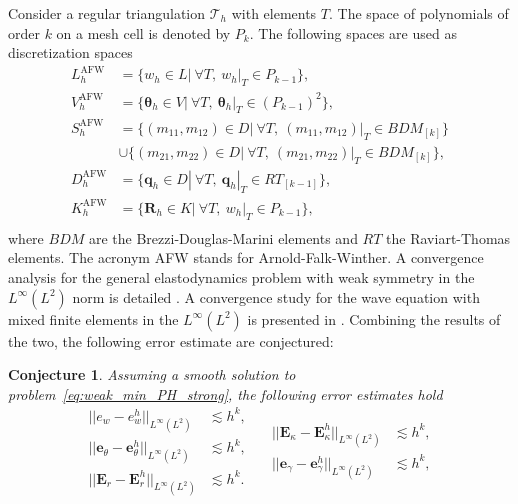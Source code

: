 \documentclass{ifacconf}
\newtheorem{conjecture}{Conjecture}
\begin{document}
Consider a regular triangulation $\mathcal{T}_h$ with elements $T$. The space of polynomials of order $k$ on a mesh cell is denoted by $P_k$. The following spaces are used as discretization spaces
\begin{equation}
\label{eq:AFW}
\begin{aligned}
L_h^{\text{AFW}} &= \{w_h \in L | \ \forall T, \ w_h|_{T} \in P_{k-1} \}, \\
V_h^{\text{AFW}} &= \{\bm{\theta}_h \in V | \ \forall T,\ \bm{\theta}_h|_{T} \in (P_{k-1})^2 \}, \\
S_h^{\text{AFW}} &= \{(m_{11}, m_{12}) \in D| \ \forall T,\ (m_{11}, m_{12})|_{T} \in BDM_{[k]} \}  \\
& \cup \{(m_{21}, m_{22}) \in D| \ \forall T,\ (m_{21}, m_{22})|_{T} \in BDM_{[k]} \}, \\
D_h^{\text{AFW}} &= \{\bm{q}_h \in D | \ \forall T,\ \bm{q}_h|_{T} \in RT_{[k-1]} \}, \\
K_h^{\text{AFW}} &= \{\bm{R}_h \in K | \ \forall T, \ w_h|_{T} \in P_{k-1} \}, \\ 
\end{aligned}
\end{equation}
where $BDM$ are the Brezzi-Douglas-Marini elements and $RT$ the Raviart-Thomas elements. The acronym AFW stands for Arnold-Falk-Winther. A convergence analysis for the general elastodynamics problem with weak symmetry in the $L^\infty (L^2)$ norm is detailed \cite{ArnoldWeak}. A convergence study for the wave equation with mixed finite elements in the $L^\infty (L^2)$ is presented in \cite{Geveci}. Combining the results of the two, the following error estimate are conjectured:
\begin{conjecture}
	Assuming a smooth solution to problem~\eqref{eq:weak_min_PH_strong}, the following error estimates hold 
	\begin{equation}
	\label{eq:errAFW}
	\begin{aligned}
	||e_w - e_w^h||_{L^{\infty}(L^2)} &\lesssim h^{k}, \\
	||\bm{e}_\theta - \bm{e}_\theta^h||_{L^{\infty}(L^2)} &\lesssim h^{k}, \\
	||\bm{E}_r - \bm{E}_r^h||_{L^{\infty}(L^2)} &\lesssim h^{k}. \\
	\end{aligned} \quad
	\begin{aligned}
	||\bm{E}_\kappa - \bm{E}_\kappa^h||_{L^{\infty}(L^2)} &\lesssim  h^{k}, \\
	||\bm{e}_\gamma - \bm{e}_\gamma^ h||_{L^{\infty}(L^2)} &\lesssim  h^{k}, \\
	\end{aligned} 
	\end{equation}
\end{conjecture}
\end{document}
